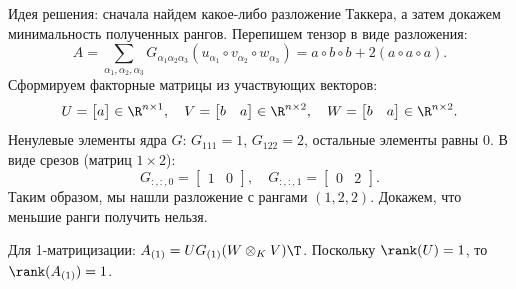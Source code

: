 \begin{tcbproof}
    Идея решения: сначала найдем какое-либо разложение Таккера, а затем докажем минимальность полученных рангов.
    Перепишем тензор в виде разложения:
    \[
        A = \sum_{\alpha_1, \alpha_2, \alpha_3} G_{\alpha_1 \alpha_2 \alpha_3} \left( u_{\alpha_1} \circ v_{\alpha_2} \circ w_{\alpha_3} \right) = a \circ b \circ b + 2 (a \circ a \circ a).
    \]
    Сформируем факторные матрицы из участвующих векторов:
    \[
        U = \begin{bmatrix} a \end{bmatrix} \in \R^{n \times 1}, \quad
        V = \begin{bmatrix} b & a \end{bmatrix} \in \R^{n \times 2}, \quad
        W = \begin{bmatrix} b & a \end{bmatrix} \in \R^{n \times 2}.
    \]
    Ненулевые элементы ядра $G$: $G_{111} = 1$, $G_{122} = 2$, остальные элементы равны $0$. 
    В виде срезов (матриц $1 \times 2$):
    \[
        G_{:,:,0} = \begin{bmatrix} 1 & 0 \end{bmatrix}, \quad G_{:,:,1} = \begin{bmatrix} 0 & 2 \end{bmatrix}.
    \]
    Таким образом, мы нашли разложение с рангами $(1, 2, 2)$. Докажем, что меньшие ранги получить нельзя.
    
    Для 1-матрицизации: $A_{(1)} = U G_{(1)} (W \otimes_K V)\T$. Поскольку $\rank(U) = 1$, то $\rank(A_{(1)}) = 1$.
    

\end{tcbproof}
